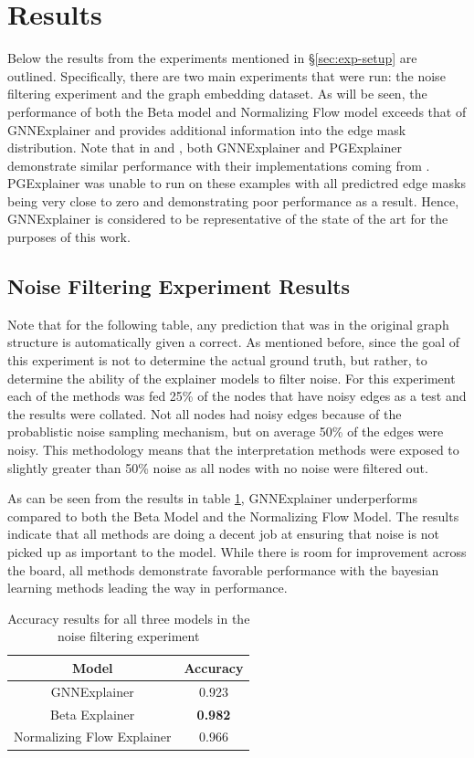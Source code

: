 \section{Results}
Below the results from the experiments mentioned in \S\ref{sec:exp-setup} are outlined. Specifically, there are two main experiments that were run: the noise filtering experiment and the graph embedding dataset. As will be seen, the performance of both the Beta model and Normalizing Flow model exceeds that of GNNExplainer and provides additional information into the edge mask distribution. Note that in \cite{yuan_explainability_2021} and \cite{lin_generative_2021}, both GNNExplainer and PGExplainer demonstrate similar performance with their implementations coming from \cite{fey_fast_2019}. PGExplainer was unable to run on these examples with all predictred edge masks being very close to zero and demonstrating poor performance as a result. Hence, GNNExplainer is considered to be representative of the state of the art for the purposes of this work.

\subsection{Noise Filtering Experiment Results}
Note that for the following table, any prediction that was in the original graph structure is automatically given a correct. As mentioned before, since the goal of this experiment is not to determine the actual ground truth, but rather, to determine the ability of the explainer models to filter noise. For this experiment each of the methods was fed 25\% of the nodes that have noisy edges as a test and the results were collated. Not all nodes had noisy edges because of the probablistic noise sampling mechanism, but on average 50\% of the edges were noisy. This methodology means that the interpretation methods were exposed to slightly greater than 50\% noise as all nodes with no noise were filtered out.

As can be seen from the results in table \ref{tab:noise-filter-res}, GNNExplainer underperforms compared to both the Beta Model and the Normalizing Flow Model. The results indicate that all methods are doing a decent job at ensuring that noise is not picked up as important to the model. While there is room for improvement across the board, all methods demonstrate favorable performance with the bayesian learning methods leading the way in performance.
\begin{table}[htb] 
	\centering
	\begin{tabular}{|c||c|} \hline
	Model & Accuracy\\ \hline \hline
	GNNExplainer & 0.923\\ 
	Beta Explainer & \textbf{0.982}\\ 
	Normalizing Flow Explainer & 0.966\\ \hline
	\end{tabular}
	\caption{Accuracy results for all three models in the noise filtering experiment}
	\label{tab:noise-filter-res}
\end{table}

